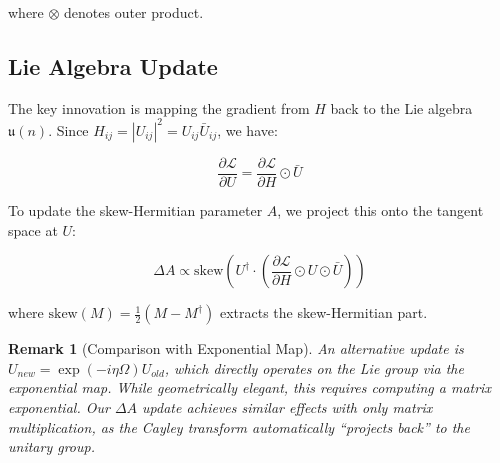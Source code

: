 \documentclass[11pt,a4paper]{article}
\newtheorem{remark}[theorem]{Remark}
\newcommand{\LL}{\mathcal{L}}
\begin{document}
where $\otimes$ denotes outer product.

\subsection{Lie Algebra Update}

The key innovation is mapping the gradient from $H$ back to the Lie algebra $\mathfrak{u}(n)$. Since $H_{ij} = |U_{ij}|^2 = U_{ij}\bar{U}_{ij}$, we have:

\begin{equation}
\frac{\partial \LL}{\partial U} = \frac{\partial \LL}{\partial H} \odot \bar{U}
\end{equation}

To update the skew-Hermitian parameter $A$, we project this onto the tangent space at $U$:

\begin{equation}
\label{eq:deltaA}
\Delta A \propto \text{skew}\left(U^\dagger \cdot \left(\frac{\partial \LL}{\partial H} \odot U \odot \bar{U}\right)\right)
\end{equation}

where $\text{skew}(M) = \frac{1}{2}(M - M^\dagger)$ extracts the skew-Hermitian part.

\begin{remark}[Comparison with Exponential Map]
An alternative update is $U_{new} = \exp(-i\eta\Omega)U_{old}$, which directly operates on the Lie group via the exponential map. While geometrically elegant, this requires computing a matrix exponential. Our $\Delta A$ update achieves similar effects with only matrix multiplication, as the Cayley transform automatically ``projects back'' to the unitary group.
\end{remark}
\end{document}
